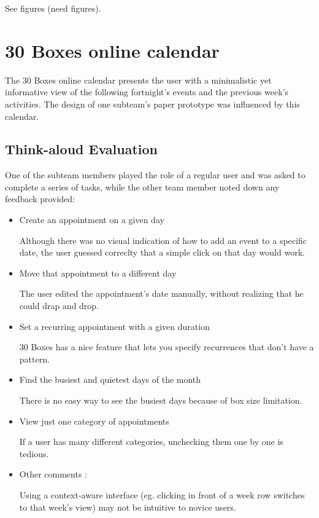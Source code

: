 \documentclass{article}
\begin{document}
See figures (need figures).

\section{30 Boxes online calendar}
The 30 Boxes online calendar presents the user with a minimalistic yet 
informative view of the following fortnight's events and the previous 
week's activities. The design of one subteam's paper prototype was influenced 
by this calendar. 
\subsection{Think-aloud Evaluation}
One of the subteam members played the role of a regular user and was asked to 
complete a series of tasks, while the other team member noted down any
feedback provided:
\begin{itemize}
\item Create an appointment on a given day

Although there was no visual indication of how to add an event to a specific
date, the user guessed correclty that a simple click on that day would work.

\item Move that appointment to a different day

The user edited the appointment's date manually, without realizing that he
could drap and drop.

\item Set a recurring appointment with a given duration

30 Boxes has a nice feature that lets you specify recurrences that don't have
a pattern.

\item Find the busiest and quietest days of the month

There is no easy way to see the busiest days because of box size limitation.

\item View just one category of appointments

If a user has many different categories, unchecking them one by one is tedious.

\item Other comments :

Using a context-aware interface (eg. clicking in front of a week row switches
to that week's view) may not be intuitive to novice users.

\end{itemize}
\end{document}
